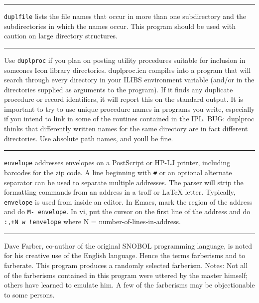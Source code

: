 {{{{{\vspace{0.25cm}\hrule{}

\texttt{duplfile} lists the file names that occur in more than one
subdirectory and the subdirectories in which the names occur. This
program should be used with caution on large directory structures.

\vspace{0.25cm}\hrule{}

Use \texttt{duplproc} if you plan on posting utility procedures suitable
for inclusion in someone{\textquotesingle}s Icon library directories.
duplproc.icn compiles into a program that will search through every
directory in your ILIBS environment
variable (and/or in the directories supplied as arguments to the
program). If it finds any duplicate procedure or record identifiers, it
will report this on the standard output. It is important to try to use
unique procedure names in programs you write, especially if you intend
to link in some of the routines contained in the IPL. BUG: duplproc
thinks that differently written names for the same directory are in
fact different directories. Use absolute path names, and
you{\textquotesingle}ll be fine.

\vspace{0.25cm}\hrule{}

\texttt{envelope} addresses envelopes on a PostScript
or HP-LJ printer, including barcodes for the zip code. A line beginning
with \texttt{\#} or an optional alternate separator can be used to
separate multiple addresses. The parser will strip the formatting
commands from an address in a troff or LaTeX letter. Typically,
\texttt{envelope} is used from inside an editor. In
Emacs, mark the region of the address and do \texttt{M-{\textbar}
envelope}. In vi, put the cursor on the first line of the address and
do \texttt{:,+N w !envelope} where N = number-of-lines-in-address.

\vspace{0.25cm}\hrule{}

Dave Farber, co-author of the original SNOBOL
programming language, is noted for his creative use of the English
language. Hence the terms {\textquotedbl}farberisms{\textquotedbl} and
{\textquotedbl}to farberate{\textquotedbl}. This program produces a
randomly selected farberism. Notes: Not all of the farberisms contained
in this program were uttered by the master himself; others have learned
to emulate him. A few of the farberisms may be objectionable to some
persons.

}}}}}

